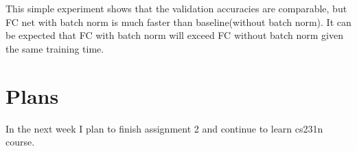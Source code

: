\documentclass{article} %
\begin{document}
This simple experiment shows that the validation accuracies are comparable, but FC net with batch norm is much faster than baseline(without batch norm). It can be expected that FC with batch norm will exceed FC without batch norm given the same training time.

\section{Plans}
In the next week I plan to finish assignment 2 and continue to learn cs231n course.
\end{document}

